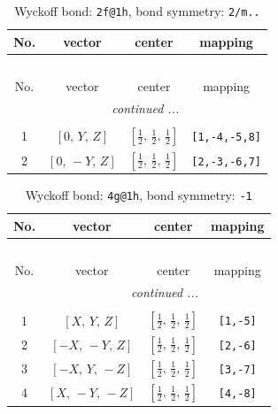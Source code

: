 \documentclass[fleqn,8pt]{jsarticle}
\begin{document}
\begin{longtable}{cccc}
\caption{Wyckoff bond: {\tt 2f@1h}, bond symmetry: {\tt 2/m..}}
 \\
 \hline \hline
No. & vector & center & mapping \\ \hline \endfirsthead

\multicolumn{3}{l}{\tablename\ \thetable{}} \\
 \hline \hline
No. & vector & center & mapping \\ \hline \endhead

 \hline \hline
\multicolumn{3}{r}{\footnotesize\it continued ...} \\ \endfoot

 \hline \hline
\multicolumn{3}{r}{} \\ \endlastfoot

1 & $\left[ 0,\, Y,\, Z \right]$ & $\left[ \frac{1}{2},\, \frac{1}{2},\, \frac{1}{2} \right]$ & {\tt [1,-4,-5,8]} \\ \hline
2 & $\left[ 0,\, - Y,\, Z \right]$ & $\left[ \frac{1}{2},\, \frac{1}{2},\, \frac{1}{2} \right]$ & {\tt [2,-3,-6,7]} \\
\end{longtable}
\renewcommand{\arraystretch}{1.2}
\begin{longtable}{cccc}
\caption{Wyckoff bond: {\tt 4g@1h}, bond symmetry: {\tt -1}}
 \\
 \hline \hline
No. & vector & center & mapping \\ \hline \endfirsthead

\multicolumn{3}{l}{\tablename\ \thetable{}} \\
 \hline \hline
No. & vector & center & mapping \\ \hline \endhead

 \hline \hline
\multicolumn{3}{r}{\footnotesize\it continued ...} \\ \endfoot

 \hline \hline
\multicolumn{3}{r}{} \\ \endlastfoot

1 & $\left[ X,\, Y,\, Z \right]$ & $\left[ \frac{1}{2},\, \frac{1}{2},\, \frac{1}{2} \right]$ & {\tt [1,-5]} \\ \hline
2 & $\left[ - X,\, - Y,\, Z \right]$ & $\left[ \frac{1}{2},\, \frac{1}{2},\, \frac{1}{2} \right]$ & {\tt [2,-6]} \\ \hline
3 & $\left[ - X,\, Y,\, - Z \right]$ & $\left[ \frac{1}{2},\, \frac{1}{2},\, \frac{1}{2} \right]$ & {\tt [3,-7]} \\ \hline
4 & $\left[ X,\, - Y,\, - Z \right]$ & $\left[ \frac{1}{2},\, \frac{1}{2},\, \frac{1}{2} \right]$ & {\tt [4,-8]} \\
\end{longtable}
\end{document}
